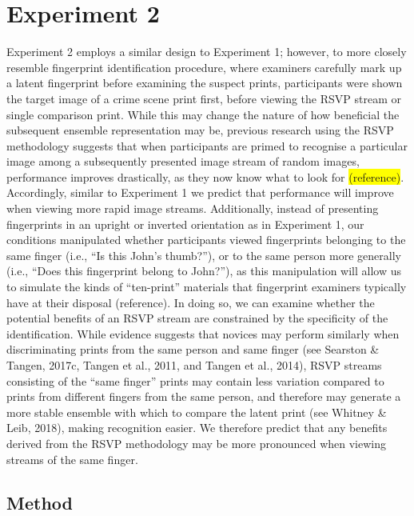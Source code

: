 \documentclass[
  english,
  man]{apa6}
\begin{document}
\hypertarget{experiment-2}{%
\section{Experiment 2}\label{experiment-2}}

Experiment 2 employs a similar design to Experiment 1; however, to more closely resemble fingerprint identification procedure, where examiners carefully mark up a latent fingerprint before examining the suspect prints, participants were shown the target image of a crime scene print first, before viewing the RSVP stream or single comparison print. While this may change the nature of how beneficial the subsequent ensemble representation may be, previous research using the RSVP methodology suggests that when participants are primed to recognise a particular image among a subsequently presented image stream of random images, performance improves drastically, as they now know what to look for \colorbox{yellow}{(reference)}. Accordingly, similar to Experiment 1 we predict that performance will improve when viewing more rapid image streams. Additionally, instead of presenting fingerprints in an upright or inverted orientation as in Experiment 1, our conditions manipulated whether participants viewed fingerprints belonging to the same finger (i.e., ``Is this John's thumb?''), or to the same person more generally (i.e., ``Does this fingerprint belong to John?''), as this manipulation will allow us to simulate the kinds of ``ten-print'' materials that fingerprint examiners typically have at their disposal (reference). In doing so, we can examine whether the potential benefits of an RSVP stream are constrained by the specificity of the identification. While evidence suggests that novices may perform similarly when discriminating prints from the same person and same finger (see Searston \& Tangen, 2017c, Tangen et al., 2011, and Tangen et al., 2014), RSVP streams consisting of the ``same finger'' prints may contain less variation compared to prints from different fingers from the same person, and therefore may generate a more stable ensemble with which to compare the latent print (see Whitney \& Leib, 2018), making recognition easier. We therefore predict that any benefits derived from the RSVP methodology may be more pronounced when viewing streams of the same finger.

\hypertarget{method}{%
\subsection{Method}\label{method}}
\end{document}
